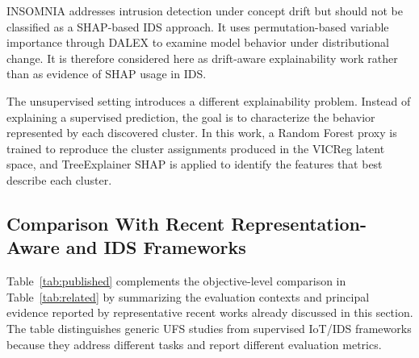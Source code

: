INSOMNIA \cite{andresini2021insomnia} addresses intrusion detection under concept drift but should not be classified as a SHAP-based IDS approach. It uses permutation-based variable importance through DALEX to examine model behavior under distributional change. It is therefore considered here as drift-aware explainability work rather than as evidence of SHAP usage in IDS.

The unsupervised setting introduces a different explainability problem. Instead of explaining a supervised prediction, the goal is to characterize the behavior represented by each discovered cluster. In this work, a Random Forest proxy is trained to reproduce the cluster assignments produced in the VICReg latent space, and TreeExplainer SHAP is applied to identify the features that best describe each cluster. 

\subsection{Comparison With Recent Representation-Aware and IDS Frameworks}

Table~\ref{tab:published} complements the objective-level comparison in Table~\ref{tab:related} by summarizing the evaluation contexts and principal evidence reported by representative recent works already discussed in this section. The table distinguishes generic UFS studies from supervised IoT/IDS frameworks because they address different tasks and report different evaluation metrics.


